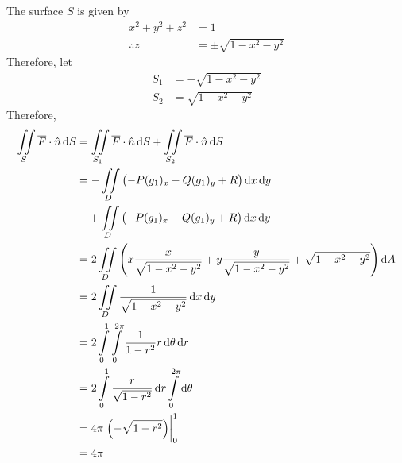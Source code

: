 \documentclass[fleqn, a4paper, 12pt, twoside]{article}
\theoremstyle{definition}
\theoremstyle{theorem}
\begin{document}
{\begin{solution}
	The surface $S$ is given by
	\begin{align*}
		x^2 + y^2 + z^2 & = 1 \\
		\therefore z    & = \pm \sqrt{1 - x^2 - y^2}
	\end{align*}
	Therefore, let
	\begin{align*}
		S_1 & = -\sqrt{1 - x^2 - y^2} \\
		S_2 & = \sqrt{1 - x^2 - y^2}
	\end{align*}
	Therefore,
	\begin{align*}
		\iint\limits_{S} \overline{F} \cdot \hat{n} \dif S & = \iint\limits_{S_1} \overline{F} \cdot \hat{n} \dif S + \iint\limits_{S_2} \overline{F} \cdot \hat{n} \dif S                         \\
                                                                   & = -\iint\limits_{D} \left( -P (g_1)_x - Q (g_1)_y + R \right) \dif x \dif y                                                           \\
                                                                   & \quad + \iint\limits_{D} \left( -P (g_1)_x - Q (g_1)_y + R \right) \dif x \dif y                                                      \\
                                                                   & = 2 \iint\limits_{D} \left( x \frac{x}{\sqrt{1 - x^2 - y^2}} + y \frac{y}{\sqrt{1 - x^2 - y^2}} + \sqrt{1 - x^2 - y^2} \right) \dif A \\
                                                                   & = 2 \iint\limits_{D} \frac{1}{\sqrt{1 - x^2 - y^2}} \dif x \dif y                                                                     \\
                                                                   & = 2 \int\limits_{0}^{1} \int\limits_{0}^{2 \pi} \frac{1}{1 - r^2} r \dif \theta \dif r                                                \\
                                                                   & = 2 \int\limits_{0}^{1} \frac{r}{\sqrt{1 - r^2}} \dif r \int\limits_{0}^{2 \pi} \dif \theta                                           \\
                                                                   & = 4 \pi \left. \left( -\sqrt{1 - r^2} \right) \right|_{0}^{1}                                                                         \\
                                                                   & = 4 \pi
	\end{align*}
\end{solution}

}
\end{document}
